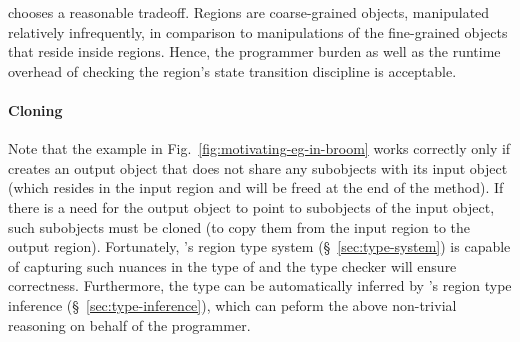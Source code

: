 \name chooses a reasonable tradeoff. Regions are coarse-grained objects, manipulated relatively infrequently,
in comparison to manipulations of the fine-grained objects that reside inside regions. Hence, the programmer burden
as well as the runtime overhead of checking the region's state transition discipline is acceptable.

\paragraph{Cloning}
Note that the example in Fig.~\ref{fig:motivating-eg-in-broom} works correctly only if 
creates an output object that does not share any subobjects with its input object (which resides in
the input region and will be freed at the end of the method).
If there is a need for the output object to point to subobjects of the input object, such subobjects
must be cloned (to copy them from the input region to the output region).
Fortunately, \name's region type system (\S~\ref{sec:type-system}) is
capable of capturing such nuances in the type of 
and the type checker will ensure correctness.
Furthermore, the type can be automatically inferred by \name's region type
inference (\S~\ref{sec:type-inference}), which can peform the above
non-trivial reasoning on behalf of the programmer.




